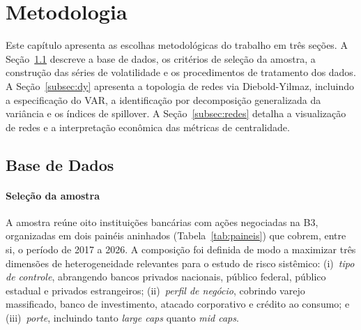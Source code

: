 \documentclass[12pt, a4paper, oneside, english, brazil]{abntex2}
\begin{document}
\chapter{Metodologia}
\label{cap:metodologia}

Este capítulo apresenta as escolhas metodológicas do trabalho em três seções. A
Seção~\ref{subsec:dados} descreve a base de dados, os critérios de seleção da amostra,
a construção das séries de volatilidade e os procedimentos de tratamento dos dados. A
Seção~\ref{subsec:dy} apresenta a topologia de redes via Diebold-Yilmaz, incluindo a
especificação do VAR, a identificação por decomposição generalizada da variância e os
índices de spillover. A Seção~\ref{subsec:redes} detalha a visualização de redes e a
interpretação econômica das métricas de centralidade.

\section{Base de Dados} 
\label{subsec:dados}

\subsubsection*{Seleção da amostra}

A amostra reúne oito instituições bancárias com ações negociadas na B3, organizadas em dois
painéis aninhados (Tabela~\ref{tab:paineis}) que cobrem, entre si, o período de 2017 a 2026. A composição foi definida de modo a maximizar três
dimensões de heterogeneidade relevantes para o estudo de risco sistêmico: (i)~\textit{tipo
de controle}, abrangendo bancos privados nacionais, público federal, público estadual e
privados estrangeiros; (ii)~\textit{perfil de negócio}, cobrindo varejo massificado, banco
de investimento, atacado corporativo e crédito ao consumo; e (iii)~\textit{porte},
incluindo tanto \textit{large caps} quanto \textit{mid caps}.
\end{document}
